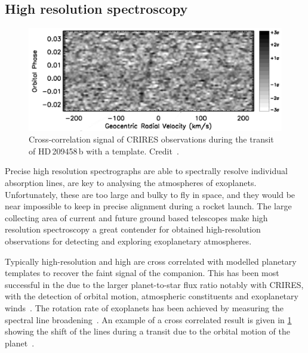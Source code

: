\subsection{High resolution spectroscopy}
\label{subsec:high_resolution_spectroscopy}

\begin{figure}
    \centering
    \includegraphics[width=0.7\linewidth]{figures/introduction/snellen2010}
    \caption[Cross-correlation signal from {CRIRES} observations of HD\,209458\,b.]{Cross-correlation signal of {CRIRES} observations during the transit of HD\,209458\,b with a  template.
    Credit~\citet{snellen_orbital_2010}.}
    \label{fig:snellen2010}
\end{figure}

Precise high resolution spectrographs are able to spectrally resolve individual absorption lines, are key to analysing the atmospheres of exoplanets. 
Unfortunately, these are too large and bulky to fly in space, and they would be near impossible to keep in precise alignment during a rocket launch.
The large collecting area of current and future ground based telescopes make high resolution spectroscopy a great contender for obtained high-resolution observations for detecting and exploring exoplanetary atmospheres.

Typically high-resolution and high \snr{} are cross correlated with modelled planetary templates to recover the faint signal of the companion.
This has been most successful in the \nir{} due to the larger planet-to-star flux ratio
notably with CRIRES, with the detection of orbital motion, atmospheric constituents and exoplanetary winds~\citep[e.g.][]{snellen_orbital_2010, dekok_detection_2013, brogi_carbon_2014, brogi_rotation_2016, schwarz_evidence_2015}.
The rotation rate of exoplanets has been achieved by measuring the spectral line broadening~\citep{snellen_fast_2014, brogi_rotation_2016}.
An example of a cross correlated result is given in \cref{fig:snellen2010} showing the shift of the  lines during a transit due to the orbital motion of the planet~\citep{snellen_orbital_2010}.

